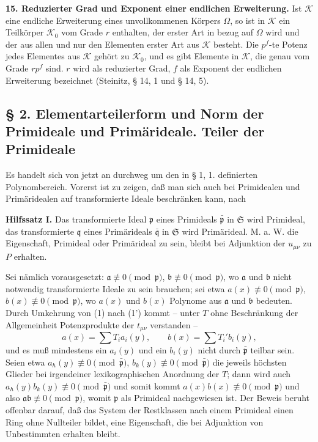 \documentclass[11pt]{article}
\providecommand{\frakS}{\mathfrak S}
\providecommand{\frakp}{\mathfrak p}
\providecommand{\frakq}{\mathfrak q}
\providecommand{\fraka}{\mathfrak a}
\providecommand{\frakb}{\mathfrak b}
\providecommand{\frakb}{\mathfrak b}
\begin{document}
\textbf{15. Reduzierter Grad und Exponent einer endlichen Erweiterung.} Ist $\mathcal K$ eine endliche Erweiterung eines unvollkommenen Körpers $\Omega$, so ist in $\mathcal K$ ein Teilkörper $\mathcal K_0$ vom Grade $r$ enthalten, der erster Art in bezug auf $\Omega$ wird und der aus allen und nur den Elementen erster Art aus $\mathcal K$ besteht. Die $p^f$-te Potenz jedes Elementes aus $\mathcal K$ gehört zu $\mathcal K_0$, und es gibt Elemente in $\mathcal K$, die genau vom Grade $rp^f$ sind. $r$ wird als reduzierter Grad, $f$ als Exponent der endlichen Erweiterung bezeichnet (Steinitz, § 14, 1 und § 14, 5).

\subsection*{§ 2. Elementarteilerform und Norm der Primideale und Primärideale. Teiler der Primideale}

Es handelt sich von jetzt an durchweg um den in § 1, 1. definierten Polynombereich. Vorerst ist zu zeigen, daß man sich auch bei Primidealen und Primäridealen auf transformierte Ideale beschränken kann, nach

\textbf{Hilfssatz I.} Das transformierte Ideal $\frakp$ eines Primideals $\bar{\frakp}$ in $\frakS$ wird Primideal, das transformierte $\frakq$ eines Primärideals $\bar{\frakq}$ in $\frakS$ wird Primärideal. M. a. W. die Eigenschaft, Primideal oder Primärideal zu sein, bleibt bei Adjunktion der $u_{\mu\nu}$ zu $P$ erhalten.

Sei nämlich vorausgesetzt: $\fraka\not\equiv0\pmod{\frakp}$, $\frakb\not\equiv0\pmod{\frakp}$, wo $\fraka$ und $\frakb$ nicht notwendig transformierte Ideale zu sein brauchen; sei etwa $a(x)\not\equiv0\pmod{\frakp}$, $b(x)\not\equiv0\pmod{\frakp}$, wo $a(x)$ und $b(x)$ Polynome aus $\fraka$ und $\frakb$ bedeuten. Durch Umkehrung von (1) nach (1') kommt -- unter $T$ ohne Beschränkung der Allgemeinheit Potenzprodukte der $t_{\mu\nu}$ verstanden --
\[
 a(x)=\sum T_i a_i(y),\qquad b(x)=\sum T_i' b_i(y),
\]
und es muß mindestens ein $a_i(y)$ und ein $b_i(y)$ nicht durch $\bar{\frakp}$ teilbar sein. Seien etwa $a_h(y)\not\equiv0\pmod{\bar{\frakp}}$, $b_k(y)\not\equiv0\pmod{\bar{\frakp}}$ die jeweils höchsten Glieder bei irgendeiner lexikographischen Anordnung der $T$; dann wird auch $a_h(y)b_k(y)\not\equiv0\pmod{\bar{\frakp}}$ und somit kommt $a(x)b(x)\not\equiv0\pmod{\frakp}$ und also $\fraka\frakb\not\equiv0\pmod{\frakp}$, womit $\frakp$ als Primideal nachgewiesen ist. Der Beweis beruht offenbar darauf, daß das System der Restklassen nach einem Primideal einen Ring ohne Nullteiler bildet, eine Eigenschaft, die bei Adjunktion von Unbestimmten erhalten bleibt.
\end{document}
